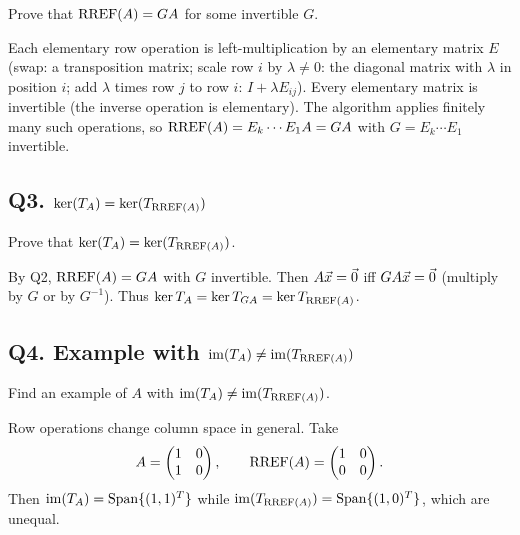 \begin{promptbox}
Prove that $\operatorname{RREF}(A)=GA$ for some invertible $G$.
\end{promptbox}

\begin{coursebox}
Each elementary row operation is left-multiplication by an elementary matrix
$E$ (swap: a transposition matrix; scale row $i$ by $\lambda\neq 0$: the
diagonal matrix with $\lambda$ in position $i$; add $\lambda$ times row $j$ to
row $i$: $I+\lambda E_{ij}$). Every elementary matrix is invertible (the inverse
operation is elementary). The algorithm applies finitely many such operations,
so $\operatorname{RREF}(A)=E_k\cdots E_1 A=GA$ with $G=E_k\cdots E_1$ invertible.
\end{coursebox}

\subsection{Q3. $\ker(T_A)=\ker(T_{\operatorname{RREF}(A)})$}

\begin{promptbox}
Prove that $\ker(T_A)=\ker(T_{\operatorname{RREF}(A)})$.
\end{promptbox}

\begin{coursebox}
By Q2, $\operatorname{RREF}(A)=GA$ with $G$ invertible. Then $A\vec{x}=\vec{0}$ iff
$GA\vec{x}=\vec{0}$ (multiply by $G$ or by $G^{-1}$). Thus
$\ker T_A=\ker T_{GA}=\ker T_{\operatorname{RREF}(A)}$.
\end{coursebox}

\subsection{Q4. Example with $\operatorname{im}(T_A)\neq\operatorname{im}(T_{\operatorname{RREF}(A)})$}

\begin{promptbox}
Find an example of $A$ with $\operatorname{im}(T_A)\neq\operatorname{im}(T_{\operatorname{RREF}(A)})$.
\end{promptbox}

\begin{coursebox}
Row operations change column space in general. Take
\[
A=\begin{pmatrix}1&0\\1&0\end{pmatrix},\qquad
\operatorname{RREF}(A)=\begin{pmatrix}1&0\\0&0\end{pmatrix}.
\]
Then $\operatorname{im}(T_A)=\operatorname{Span}\{(1,1)^T\}$ while
$\operatorname{im}(T_{\operatorname{RREF}(A)})=\operatorname{Span}\{(1,0)^T\}$, which are unequal.
\end{coursebox}

